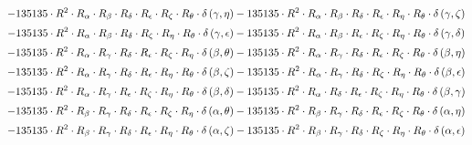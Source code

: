 \begin{subequations}
\begin{gather}
 \\[0.2em] \notag 		 - 135135 \cdot R^{2} \cdot R_{\alpha{}} \cdot R_{\beta{}} \cdot R_{\delta{}} \cdot R_{\epsilon{}} \cdot R_{\zeta{}} \cdot R_{\theta{}} \cdot \delta{}\left(\gamma{}, \eta{}\right)- 135135 \cdot R^{2} \cdot R_{\alpha{}} \cdot R_{\beta{}} \cdot R_{\delta{}} \cdot R_{\epsilon{}} \cdot R_{\eta{}} \cdot R_{\theta{}} \cdot \delta{}\left(\gamma{}, \zeta{}\right) 
 \\[0.2em] \notag 		 - 135135 \cdot R^{2} \cdot R_{\alpha{}} \cdot R_{\beta{}} \cdot R_{\delta{}} \cdot R_{\zeta{}} \cdot R_{\eta{}} \cdot R_{\theta{}} \cdot \delta{}\left(\gamma{}, \epsilon{}\right)- 135135 \cdot R^{2} \cdot R_{\alpha{}} \cdot R_{\beta{}} \cdot R_{\epsilon{}} \cdot R_{\zeta{}} \cdot R_{\eta{}} \cdot R_{\theta{}} \cdot \delta{}\left(\gamma{}, \delta{}\right) 
 \\[0.2em] \notag 		 - 135135 \cdot R^{2} \cdot R_{\alpha{}} \cdot R_{\gamma{}} \cdot R_{\delta{}} \cdot R_{\epsilon{}} \cdot R_{\zeta{}} \cdot R_{\eta{}} \cdot \delta{}\left(\beta{}, \theta{}\right)- 135135 \cdot R^{2} \cdot R_{\alpha{}} \cdot R_{\gamma{}} \cdot R_{\delta{}} \cdot R_{\epsilon{}} \cdot R_{\zeta{}} \cdot R_{\theta{}} \cdot \delta{}\left(\beta{}, \eta{}\right) 
 \\[0.2em] \notag 		 - 135135 \cdot R^{2} \cdot R_{\alpha{}} \cdot R_{\gamma{}} \cdot R_{\delta{}} \cdot R_{\epsilon{}} \cdot R_{\eta{}} \cdot R_{\theta{}} \cdot \delta{}\left(\beta{}, \zeta{}\right)- 135135 \cdot R^{2} \cdot R_{\alpha{}} \cdot R_{\gamma{}} \cdot R_{\delta{}} \cdot R_{\zeta{}} \cdot R_{\eta{}} \cdot R_{\theta{}} \cdot \delta{}\left(\beta{}, \epsilon{}\right) 
 \\[0.2em] \notag 		 - 135135 \cdot R^{2} \cdot R_{\alpha{}} \cdot R_{\gamma{}} \cdot R_{\epsilon{}} \cdot R_{\zeta{}} \cdot R_{\eta{}} \cdot R_{\theta{}} \cdot \delta{}\left(\beta{}, \delta{}\right)- 135135 \cdot R^{2} \cdot R_{\alpha{}} \cdot R_{\delta{}} \cdot R_{\epsilon{}} \cdot R_{\zeta{}} \cdot R_{\eta{}} \cdot R_{\theta{}} \cdot \delta{}\left(\beta{}, \gamma{}\right) 
 \\[0.2em] \notag 		 - 135135 \cdot R^{2} \cdot R_{\beta{}} \cdot R_{\gamma{}} \cdot R_{\delta{}} \cdot R_{\epsilon{}} \cdot R_{\zeta{}} \cdot R_{\eta{}} \cdot \delta{}\left(\alpha{}, \theta{}\right)- 135135 \cdot R^{2} \cdot R_{\beta{}} \cdot R_{\gamma{}} \cdot R_{\delta{}} \cdot R_{\epsilon{}} \cdot R_{\zeta{}} \cdot R_{\theta{}} \cdot \delta{}\left(\alpha{}, \eta{}\right) 
 \\[0.2em] \notag 		 - 135135 \cdot R^{2} \cdot R_{\beta{}} \cdot R_{\gamma{}} \cdot R_{\delta{}} \cdot R_{\epsilon{}} \cdot R_{\eta{}} \cdot R_{\theta{}} \cdot \delta{}\left(\alpha{}, \zeta{}\right)- 135135 \cdot R^{2} \cdot R_{\beta{}} \cdot R_{\gamma{}} \cdot R_{\delta{}} \cdot R_{\zeta{}} \cdot R_{\eta{}} \cdot R_{\theta{}} \cdot \delta{}\left(\alpha{}, \epsilon{}\right) 

\end{gather}
\end{subequations}
